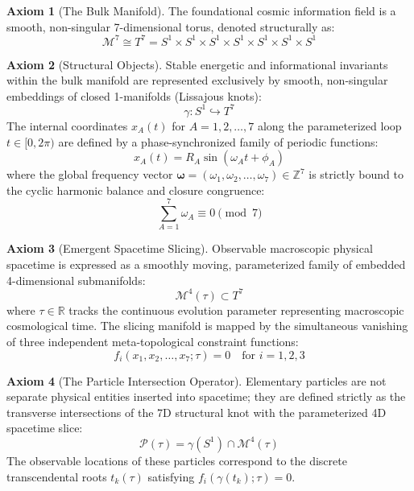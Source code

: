 \documentclass[12pt,letterpaper]{article}
\theoremstyle{definition}
\newtheorem{axiom}{Axiom}
\begin{document}
\begin{axiom}[The Bulk Manifold]
The foundational cosmic information field is a smooth, non-singular 7-dimensional torus, denoted structurally as:
\begin{equation}
    \mathcal{M}^7 \cong T^7 = S^1 \times S^1 \times S^1 \times S^1 \times S^1 \times S^1 \times S^1
\end{equation}
\end{axiom}

\begin{axiom}[Structural Objects]
Stable energetic and informational invariants within the bulk manifold are represented exclusively by smooth, non-singular embeddings of closed 1-manifolds (Lissajous knots):
\begin{equation}
    \gamma: S^1 \hookrightarrow T^7
\end{equation}
The internal coordinates $x_A(t)$ for $A = 1, 2, \dots, 7$ along the parameterized loop $t \in [0, 2\pi)$ are defined by a phase-synchronized family of periodic functions:
\begin{equation}
    x_A(t) = R_A \sin(\omega_A t + \phi_A)
\end{equation}
where the global frequency vector $\boldsymbol{\omega} = (\omega_1, \omega_2, \dots, \omega_7) \in \mathbb{Z}^7$ is strictly bound to the cyclic harmonic balance and closure congruence:
\begin{equation}
    \sum_{A=1}^7 \omega_A \equiv 0 \pmod 7
\end{equation}
\end{axiom}

\begin{axiom}[Emergent Spacetime Slicing]
Observable macroscopic physical spacetime is expressed as a smoothly moving, parameterized family of embedded 4-dimensional submanifolds:
\begin{equation}
    \mathcal{M}^4(\tau) \subset T^7
\end{equation}
where $\tau \in \mathbb{R}$ tracks the continuous evolution parameter representing macroscopic cosmological time. The slicing manifold is mapped by the simultaneous vanishing of three independent meta-topological constraint functions:
\begin{equation}
    f_i(x_1, x_2, \dots, x_7; \tau) = 0 \quad \text{for } i = 1, 2, 3
\end{equation}
\end{axiom}

\begin{axiom}[The Particle Intersection Operator]
Elementary particles are not separate physical entities inserted into spacetime; they are defined strictly as the transverse intersections of the 7D structural knot with the parameterized 4D spacetime slice:
\begin{equation}
    \mathcal{P}(\tau) = \gamma(S^1) \cap \mathcal{M}^4(\tau)
\end{equation}
The observable locations of these particles correspond to the discrete transcendental roots $t_k(\tau)$ satisfying $f_i(\gamma(t_k); \tau) = 0$.
\end{axiom}
\end{document}
